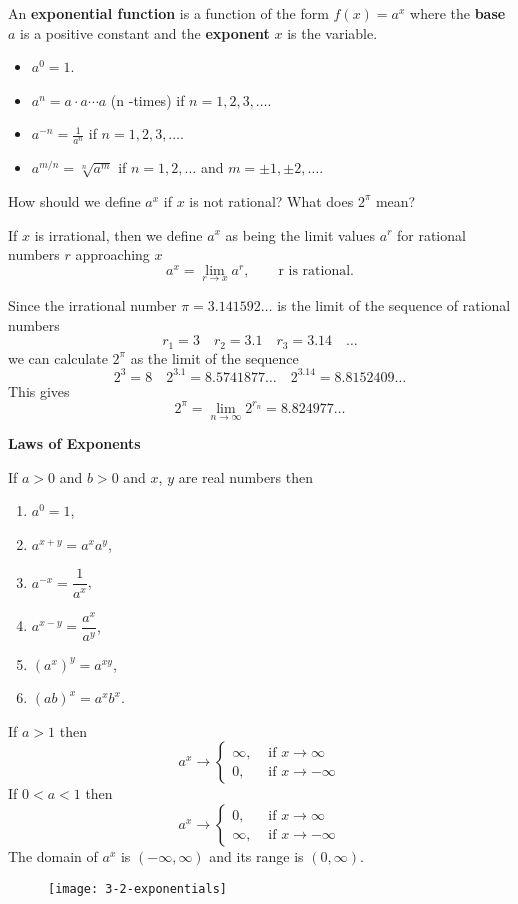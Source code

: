 \documentclass[../main.tex]{subfiles}
\begin{document}
An \textbf{exponential function} is a function of the form $f(x) = a^x$ where the \textbf{base} $a$ is a positive constant and the \textbf{exponent} $x$ is the variable.

\begin{itemize}
    \item $a^0 = 1$.
    \item $a^n = a \cdot a \cdots a$ (n -times) if $n = 1, 2, 3, \dots$.
    \item $a^{-n} = \frac{1}{a^n}$ if $n=1, 2, 3, \dots$.
    \item $a^{m/n} = \sqrt[n]{a^m}$ if $n=1, 2, \dots$ and $m = \pm 1, \pm 2, \dots$.
\end{itemize}

How should we define $a^x$ if $x$ is not rational? What does $2^{\pi}$ mean?

If $x$ is irrational, then we define $a^x$ as being the limit values $a^r$ for rational numbers $r$ approaching $x$
\[
    a^x = \lim_{r \to x} a^r, \qquad \text{r is rational}.
\]

\begin{example}
    Since the irrational number $\pi = 3.141592\dots$ is the limit of the sequence of rational numbers
    \[
        r_1 = 3 \quad r_2 = 3.1 \quad r_3 = 3.14 \quad \dots
    \]
    we can calculate $2^{\pi}$ as the limit of the sequence
    \[
        2^3 = 8 \quad 2^{3.1} = 8.5741877\dots \quad 2^{3.14} = 8.8152409\dots
    \]
    This gives
    \[
        2^{\pi} = \lim_{n \to \infty} 2^{r_n} = 8.824977\dots
    \]
\end{example}

\textbf{Laws of Exponents}

If $a>0$ and $b>0$ and $x$, $y$ are real numbers then
\begin{multicols}{2}
\begin{enumerate}
    \item $a^{0} = 1$,
    \item $a^{x+y} = a^x a^y$,
    \item $a^{-x} = \dfrac{1}{a^x}$,
    \item $a^{x-y} = \dfrac{a^x}{a^y}$,
    \item $(a^x)^y = a^{xy}$,
    \item $(ab)^x = a^x b^x$.
\end{enumerate}
\end{multicols}

If $a>1$ then
\[
    a^x \to
    \begin{cases}
        \infty, &\text{ if } x \to \infty \\
        0, & \text{ if } x \to -\infty
    \end{cases}
\]
If $0<a<1$ then
\[
    a^x \to
    \begin{cases}
        0, &\text{ if } x \to \infty \\
        \infty, & \text{ if } x \to -\infty
    \end{cases}
\]
The domain of $a^x$ is $(-\infty, \infty)$ and its range is $(0, \infty)$.
\begin{figure}[H]
    \centering
    \texttt{[image: 3-2-exponentials]}
\end{figure}
\end{document}
